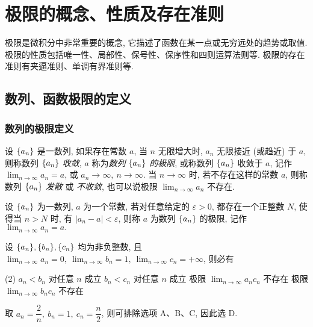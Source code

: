 \section{极限的概念、性质及存在准则}

极限是微积分中非常重要的概念, 它描述了函数在某一点或无穷远处的趋势或取值. 极限的性质包括唯一性、局部性、保号性、保序性和四则运算法则等. 极限的存在准则有夹逼准则、单调有界准则等.

\subsection{数列、函数极限的定义}

\subsubsection{数列的极限定义}

\begin{definition}[数列极限 A]
    设 $\qty{a_n}$ 是一数列, 如果存在常数 $a$, 当 $n$ 无限增大时, $a_n$ 无限接近 (或趋近) 于 $a$, 则称数列 $\qty{a_n}$ \textit{收敛}, $a$ 称为\textit{数列} $\qty{a_n}$ \textit{的极限},
    或称数列 $\qty{a_n}$ 收敛于 $a$, 记作 $\displaystyle\lim_{n\to\infty}a_n=a$, 或 $a_n\to\infty,~n\to\infty$.
    当 $n\to\infty$ 时, 若不存在这样的常数 $a$, 则称数列 $\qty{a_n}$ \textit{发散} 或 \textit{不收敛}, 也可以说极限 $\displaystyle\lim_{n\to\infty}a_n$ 不存在.
\end{definition}

\begin{definition}[数列极限 B]
    设 $\qty{a_n}$ 为一数列, $a$ 为一个常数, 若对任意给定的 $\varepsilon>0$, 都存在一个正整数 $N$, 使得当 $n>N$ 时, 有 $|a_n-a|<\varepsilon$, 则称 $a$ 为数列 $\qty{a_n}$ 的极限, 记作 $\displaystyle\lim_{n\to\infty}a_n=a.$
\end{definition}

\begin{example}[2003 数一]
    设 $\qty{a_n},\qty{b_n},\qty{c_n}$ 均为非负整数, 且 $\displaystyle\lim_{n\to\infty}a_n=0,~\lim_{n\to\infty}b_n=1,~\lim_{n\to\infty}c_n=+\infty$, 则必有
    \begin{tasks}(2)
        \task $a_n<b_n$ 对任意 $n$ 成立
        \task $b_n<c_n$ 对任意 $n$ 成立
        \task 极限 $\displaystyle\lim_{n\to\infty}a_nc_n$ 不存在
        \task 极限 $\displaystyle\lim_{n\to\infty}b_nc_n$ 不存在
    \end{tasks}
\end{example}
\begin{solution}
    取 $a_n=\dfrac{2}{n},~b_n=1,~c_n=\dfrac{n}{2}$, 则可排除选项 A、B、C, 因此选 D.
\end{solution}

